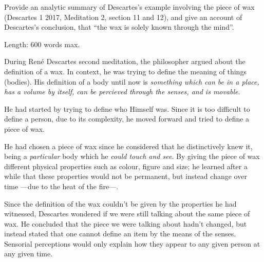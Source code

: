 \documentclass{assignment}
\begin{document}
\begin{problem}
Provide an analytic summary of Descartes’s example involving the piece of wax (Descartes 1 2017, Meditation 2, section 11 and 12), and give an account of Descartes’s conclusion, that “the wax is solely known through the mind”.%

Length: 600 words max.%
\end{problem}

\vspace*{2\baselineskip}
\begin{answer}
During René Descartes second meditation, the philosopher argued about the definition of a wax. In context, he was trying to define the meaning of things (bodies). His definition of a body until now is \emph{something which can be in a place, has a volume by itself, can be percieved through the senses, and is movable}.%

He had started by trying to define who Himself was. Since it is too difficult to define a person, due to its complexity, he moved forward and tried to define a piece of wax.%

\vspace*{1\baselineskip}
He had chosen a piece of wax since he considered that he distinctively knew it, being a \emph{particular} body which he \emph{could touch and see}. By giving the piece of wax different physical properties such as colour, figure and size; he learned after a while that these properties would not be permanent, but instead change over time ---due to the heat of the fire---.%

Since the definition of the wax couldn't be given by the properties he had witnessed, Descartes wondered if we were still talking about the same piece of wax. He concluded that the piece we were talking about hadn't changed, but instead stated that one cannot define an item by the means of the senses. Sensorial perceptions would only explain how they appear to any given person at any given time.%




\end{answer}
\end{document}
